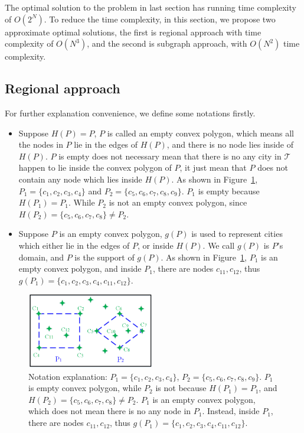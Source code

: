 The optimal solution to the problem in last section has running time complexity of $O(2^N)$. To reduce the time complexity, in this  section, we propose two approximate optimal solutions, the first is regional approach with time complexity of $O(N^3)$, and the second is subgraph approach, with $O(N^2)$ time complexity.
\subsection{Regional approach}
For further explanation convenience, we define some notations firstly.
\begin{itemize}
  \item Suppose $H(P)=P$, $P$ is called an empty convex polygon, which means all the nodes in $P$ lie in the edges of $H(P)$, and there is no node lies inside of $H(P)$. $P$ is empty does not necessary mean that there is no any city in $\mathcal{T}$ happen to lie inside the convex polygon of $P$, it just mean that $P$ does not contain any node which lies inside $H(P)$. As shown in Figure~\ref{fig:notation}, $P_1=\{c_1,c_2,c_3,c_4\}$ and $P_2=\{c_5, c_6, c_7, c_8, c_9\}$. $P_1$ is empty because $H(P_1)=P_1$. While $P_2$ is not an empty convex polygon, since $H(P_2)=\{c_5, c_6, c_7, c_8\}\neq P_2$.
    \item Suppose $P$ is an empty convex polygon, $g(P)$ is used to represent cities which either lie in the edges of $P$, or inside $H(P)$. We call $g(P)$ is $P$'s domain, and $P$ is the support of $g(P)$. As shown in Figure~\ref{fig:notation}, $P_1$ is an empty convex polygon, and inside $P_1$, there are nodes $c_{11}, c_{12}$, thus $g(P_1)=\{c_1,c_2,c_3,c_4,c_{11},c_{12}\}$.
\end{itemize}

\begin{figure}[t]
	\centering
	\includegraphics[width=2.2in,height=1.3in]{figures/bruteforce.png}
	\caption{Notation explanation: $P_1=\{c_1,c_2,c_3,c_4\}$, $P_2=\{c_5, c_6, c_7, c_8, c_9\}$. $P_1$ is empty convex polygon, while $P_2$ is not because $H(P_1)=P_1$, and $H(P_2)=\{c_5, c_6, c_7, c_8\}\neq P_2$. $P_1$ is an empty convex polygon, which does not mean there is no any node in $P_1$. Instead, inside $P_1$, there are nodes $c_{11}, c_{12}$, thus $g(P_1)=\{c_1,c_2,c_3,c_4,c_{11},c_{12}\}$.}
	\label{fig:notation}
\end{figure}



